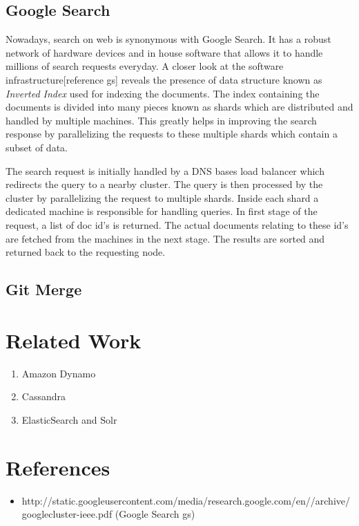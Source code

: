 \documentclass[a4paper, 11pt]{article}
\begin{document}
\subsection*{Google Search}
Nowadays, search on web is synonymous with Google Search. It has a robust network of hardware devices and in house software that allows it to handle millions of search requests everyday. A closer look at the software infrastructure[reference gs] reveals the presence of data structure known as \textit{Inverted Index} used for indexing the documents. The index containing the documents is divided into many pieces known as shards which are distributed and handled by multiple machines. This greatly helps in improving the search response by parallelizing the requests to these multiple shards which contain a subset of data. 
\par The search request is initially handled by a DNS bases load balancer which redirects the query to a nearby cluster. The query is then processed by the cluster by parallelizing the request to multiple shards. Inside each shard a dedicated machine is responsible for handling queries. In first stage of the request, a list of doc id's is returned. The actual documents relating to these id's are fetched from the machines in the next stage. The results are sorted and returned back to the requesting node.


\subsection*{Git Merge}



\section{Related Work}

\begin{enumerate}
	\item Amazon Dynamo
	\item Cassandra
	\item ElasticSearch and Solr
\end{enumerate}



\section{References}

\begin{itemize}

\item http://static.googleusercontent.com/media/research.google.com/en//archive/googlecluster-ieee.pdf (Google Search gs)

\end{itemize}
\end{document}
